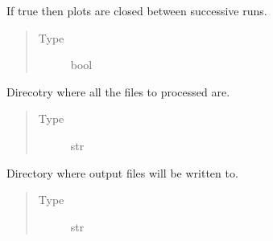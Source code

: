 \documentclass[a4paper,10pt,english]{sphinxmanual}
\begin{document}
\begin{fulllineitems}
\begin{fulllineitems}
\begin{quote}
\begin{description}
\end{description}\end{quote}

\end{fulllineitems}


\begin{fulllineitems}
\label{\detokenize{sfgtools:sfgtools.SFGProcessTools.close_plots_check}}
\sphinxAtStartPar
If true then plots are closed between successive runs.
\begin{quote}\begin{description}
\item[{Type}] \leavevmode
\sphinxAtStartPar
bool

\end{description}\end{quote}

\end{fulllineitems}


\begin{fulllineitems}
\label{\detokenize{sfgtools:sfgtools.SFGProcessTools.data_directory}}
\sphinxAtStartPar
Direcotry where all the files to processed are.
\begin{quote}\begin{description}
\item[{Type}] \leavevmode
\sphinxAtStartPar
str

\end{description}\end{quote}

\end{fulllineitems}


\begin{fulllineitems}
\label{\detokenize{sfgtools:sfgtools.SFGProcessTools.write_directory}}
\sphinxAtStartPar
Directory where output files will be written to.
\begin{quote}\begin{description}
\item[{Type}] \leavevmode
\sphinxAtStartPar
str


\end{description}
\end{quote}
\end{fulllineitems}
\end{fulllineitems}
\end{document}
